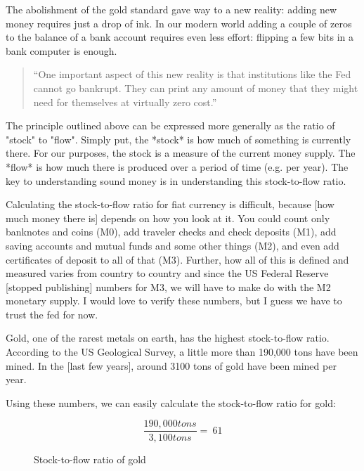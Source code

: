 The abolishment of the gold standard gave way to a new reality: adding
new money requires just a drop of ink. In our modern world adding a
couple of zeros to the balance of a bank account requires even less
effort: flipping a few bits in a bank computer is enough.

\begin{quotation}
``One important aspect of this new reality is that institutions like
the Fed cannot go bankrupt. They can print any amount of money that
they might need for themselves at virtually zero cost.''
\end{quotation}

The principle outlined above can be expressed more generally as the
ratio of "stock" to "flow". Simply put, the *stock* is how much of
something is currently there. For our purposes, the stock is a measure
of the current money supply. The *flow* is how much there is produced
over a period of time (e.g. per year). The key to understanding sound
money is in understanding this stock-to-flow ratio.

Calculating the stock-to-flow ratio for fiat currency is difficult,
because [how much money there is] depends on how you look at it. You
could count only banknotes and coins (M0), add traveler checks and check
deposits (M1), add saving accounts and mutual funds and some other
things (M2), and even add certificates of deposit to all of that (M3).
Further, how all of this is defined and measured varies from country to
country and since the US Federal Reserve [stopped publishing] numbers
for M3, we will have to make do with the M2 monetary supply. I would
love to verify these numbers, but I guess we have to trust the fed for
now.

Gold, one of the rarest metals on earth, has the highest stock-to-flow
ratio. According to the US Geological Survey, a little more than 190,000
tons have been mined. In the [last few years], around 3100 tons of gold
have been mined per year.

Using these numbers, we can easily calculate the stock-to-flow ratio for
gold:

\begin{figure}
  \centering
  \begin{equation}
  \frac{190,000 tons}{3,100 tons} = ~ 61
  \end{equation}
  \caption{Stock-to-flow ratio of gold}
  \label{fig:stock-to-flow-gold}
\end{figure}

